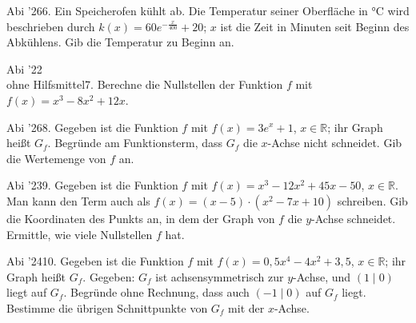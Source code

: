 \documentclass[11pt]{article}
\begin{document}
\pfgruppe{}
\begin{pfaufg}{Abi ’26}{6.}{}
Ein Speicherofen kühlt ab. Die Temperatur seiner Oberfläche in °C wird beschrieben durch $k(x) = 60e^{-\tfrac{x}{400}} + 20$; $x$ ist die Zeit in Minuten seit Beginn des Abkühlens. Gib die Temperatur zu Beginn an.
\end{pfaufg}
\pfgruppe{}
\begin{pfaufg}{Abi ’22\\ohne Hilfsmittel}{7.}{}
Berechne die Nullstellen der Funktion $f$ mit $f(x) = x^3 - 8x^2 + 12x$.
\end{pfaufg}
\pfgruppe{}
\begin{pfaufg}{Abi ’26}{8.}{}
Gegeben ist die Funktion $f$ mit $f(x) = 3e^x + 1$, $x \in \mathbb{R}$; ihr Graph heißt $G_f$. Begründe am Funktionsterm, dass $G_f$ die $x$-Achse nicht schneidet. Gib die Wertemenge von $f$ an.
\par\smallskip\noindent {}\par
{}
\fusshilfe{\mbox{8:~Wertemenge ]1}}
\end{pfaufg}
\pfgruppe{}
\begin{pfaufg}{Abi ’23}{9.}{}
Gegeben ist die Funktion $f$ mit $f(x) = x^3 - 12x^2 + 45x - 50$, $x \in \mathbb{R}$. Man kann den Term auch als $f(x) = (x - 5)\cdot(x^2 - 7x + 10)$ schreiben. Gib die Koordinaten des Punkts an, in dem der Graph von $f$ die $y$-Achse schneidet. Ermittle, wie viele Nullstellen $f$ hat.
\end{pfaufg}
\pfgruppe{}
\begin{pfaufg}{Abi ’24}{10.}{}
Gegeben ist die Funktion $f$ mit $f(x) = 0{,}5x^4 - 4x^2 + 3{,}5$, $x \in \mathbb{R}$; ihr Graph heißt $G_f$. Gegeben: $G_f$ ist achsensymmetrisch zur $y$-Achse, und $(1 \mid 0)$ liegt auf $G_f$. Begründe ohne Rechnung, dass auch $(-1 \mid 0)$ auf $G_f$ liegt. Bestimme die übrigen Schnittpunkte von $G_f$ mit der $x$-Achse.
\end{pfaufg}
\end{document}
